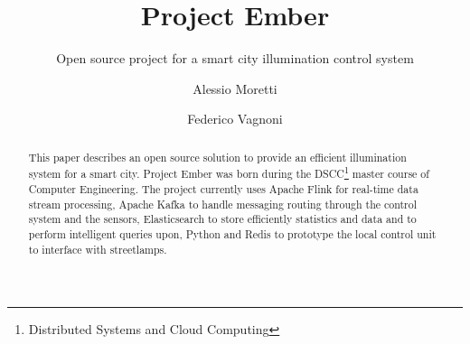 \documentclass[sigconf, authordraft]{acmart}
\begin{document}
\title{Project Ember}
\subtitle{Open source project for a smart city illumination control system}

\author{Alessio Moretti}

\author{Federico Vagnoni}


\begin{abstract}
	This paper describes an open source solution to provide an efficient illumination system for a smart city. Project Ember was born during the DSCC\footnote{Distributed Systems and Cloud Computing} master course of Computer Engineering. The project currently uses Apache Flink for real-time data stream processing, Apache Kafka to handle messaging routing through the control system and the sensors, Elasticsearch to store efficiently statistics and data and to perform intelligent queries upon, Python and Redis to prototype the local control unit to interface with streetlamps.
\end{abstract}


	
\maketitle
	

	

\end{document}
